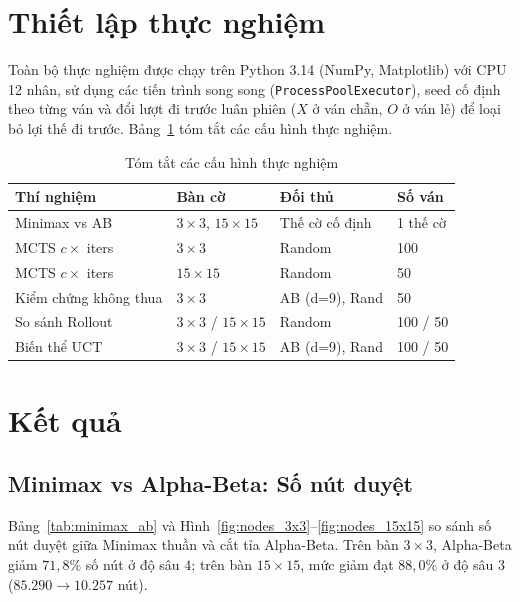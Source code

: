 \documentclass[conference]{IEEEtran}
\begin{document}
\section{Thiết lập thực nghiệm}
Toàn bộ thực nghiệm được chạy trên Python 3.14 (NumPy, Matplotlib) với CPU 12 nhân, sử dụng các tiến trình song song (\texttt{ProcessPoolExecutor}), seed cố định theo từng ván và đổi lượt đi trước luân phiên ($X$ ở ván chẵn, $O$ ở ván lẻ) để loại bỏ lợi thế đi trước. Bảng~\ref{tab:setup} tóm tắt các cấu hình thực nghiệm.

\begin{table}[t]
\centering
\caption{Tóm tắt các cấu hình thực nghiệm}
\label{tab:setup}
\setlength{\tabcolsep}{3.5pt}
\begin{tabular}{@{}llll@{}}
\toprule
Thí nghiệm & Bàn cờ & Đối thủ & Số ván \\
\midrule
Minimax vs AB & $3\times 3$, $15\times 15$ & Thế cờ cố định & 1 thế cờ \\
MCTS $c \times$ iters & $3\times 3$ & Random & 100 \\
MCTS $c \times$ iters & $15\times 15$ & Random & 50 \\
Kiểm chứng không thua & $3\times 3$ & AB (d=9), Rand & 50 \\
So sánh Rollout & $3\times 3$ / $15\times 15$ & Random & 100 / 50 \\
Biến thể UCT & $3\times 3$ / $15\times 15$ & AB (d=9), Rand & 100 / 50 \\
\bottomrule
\end{tabular}
\end{table}

\section{Kết quả}

\subsection{Minimax vs Alpha-Beta: Số nút duyệt}
Bảng~\ref{tab:minimax_ab} và Hình~\ref{fig:nodes_3x3}--\ref{fig:nodes_15x15} so sánh số nút duyệt giữa Minimax thuần và cắt tỉa Alpha-Beta. Trên bàn $3\times 3$, Alpha-Beta giảm $71{,}8\%$ số nút ở độ sâu $4$; trên bàn $15\times 15$, mức giảm đạt $88{,}0\%$ ở độ sâu $3$ ($85.290 \rightarrow 10.257$ nút).
\end{document}
